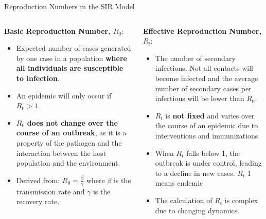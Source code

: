\begin{frame}{Reproduction Numbers in the SIR Model}
\footnotesize
\begin{columns}
    \begin{column}{0.5\textwidth}
    \textbf{Basic Reproduction Number, \(R_0\)}:
\begin{itemize}
    \item Expected number of cases generated by one case in a population \textbf{where all individuals are susceptible to infection}.
    \item An epidemic will only occur if \(R_0 > 1\).
    \item \(R_0\) \textbf{does not change over the course of an outbreak}, as it is a property of the pathogen and the interaction between the host population and the environment.
    \item Derived from: \(R_0 = \frac{\beta}{\gamma}\) where \(\beta\) is the transmission rate and \(\gamma\) is the recovery rate.
\end{itemize}
    \end{column}

\pause
    \begin{column}{0.5\textwidth}
        \textbf{Effective Reproduction Number, \(R_t\)}:
\begin{itemize}
    \item The number of secondary infections. Not all contacts will become infected and the average number of secondary cases per infectious will be lower than \(R_0\).
    \item \(R_t\) is \textbf{not fixed} and varies over the course of an epidemic due to interventions and immunizations.
    \item When \(R_t\) falls below 1, the outbreak is under control, leading to a decline in new cases.  \(R_t\) 1 means endemic
    \item The calculation of \(R_t\) is  complex  due to changing dynamics.
\end{itemize}
    \end{column}
\end{columns}
\end{frame}

